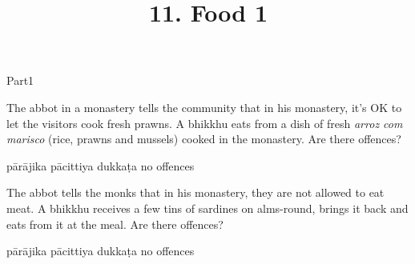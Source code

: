 \documentclass[11pt,oneside]{memoir}
\title{11. Food 1}
\date{\the\year}
\begin{document}
\maketitle

\begin{exam}{Part1}

\begin{problem}

  The abbot in a monastery tells the community that in his monastery, it's OK to let the visitors cook fresh prawns.
  A bhikkhu eats from a dish of fresh \emph{arroz com marisco} (rice, prawns and mussels) cooked in the monastery.
  Are there offences?

  \bigskip

  \begin{answers}{2}
    \bChoices
     pārājika\eAns
     pācittiya\eAns
     dukkaṭa\eAns
     no offences\eAns
    \eChoices
  \end{answers}

\end{problem}

\problemDivide

\begin{problem}

  The abbot tells the monks that in his monastery, they are not allowed to eat meat.
  A bhikkhu receives a few tins of sardines on alms-round, brings it back and eats from it at the meal.
  Are there offences?

  \bigskip

  \begin{answers}{2}
    \bChoices
     pārājika\eAns
     pācittiya\eAns
     dukkaṭa\eAns
     no offences\eAns
    \eChoices
  \end{answers}

\end{problem}

\end{exam}
\end{document}

